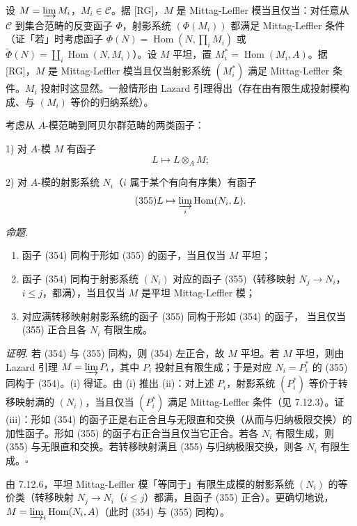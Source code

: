  设 $M=\varinjlim M_i$，$M_i\in\mathcal{C}$。据 [RG]，$M$ 是 Mittag-Leffler 模当且仅当：对任意从 $\mathcal{C}$ 到集合范畴的反变函子 $\Phi$，射影系统 $(\Phi(M_i))$ 都满足 Mittag-Leffler 条件（证「若」时考虑函子 $\Phi(N)=\operatorname{Hom}(N,\prod_i M_i)$ 或 $\tilde\Phi(N)=\coprod_i\operatorname{Hom}(N,M_i)$）。设 $M$ 平坦，置 $M^{*}_i=\operatorname{Hom}(M_i,A)$。据 [RG]，$M$ 是 Mittag-Leffler 模当且仅当射影系统 $(M^{*}_i)$ 满足 Mittag-Leffler 条件。$M_i$ 投射时这显然。一般情形由 Lazard 引理得出（存在由有限生成投射模构成、与 $(M_i)$ 等价的归纳系统）。

 考虑从 $A$-模范畴到阿贝尔群范畴的两类函子：

1) 对 $A$-模 $M$ 有函子
\begin{equation}\tag{354}
L\mapsto L\otimes_A M;
\end{equation}

2) 对 $A$-模的射影系统 $N_i$（$i$ 属于某个有向有序集）有函子
\begin{equation}\tag{355}
L\mapsto\varinjlim_i\operatorname{Hom}(N_i,L).
\end{equation}

 \emph{命题.}
\begin{enumerate}[label=(\roman*),leftmargin=2.2em]
\item 函子 (354) 同构于形如 (355) 的函子，当且仅当 $M$ 平坦；
\item 函子 (354) 同构于射影系统 $(N_i)$ 对应的函子 (355)（转移映射 $N_j\to N_i$，$i\le j$，都满），当且仅当 $M$ 是平坦 Mittag-Leffler 模；
\item 对应满转移映射射影系统的函子 (355) 同构于形如 (354) 的函子，%
%
当且仅当 (355) 正合且各 $N_i$ 有限生成。
\end{enumerate}

\emph{证明.} 若 (354) 与 (355) 同构，则 (354) 左正合，故 $M$ 平坦。若 $M$ 平坦，则由 Lazard 引理 $M=\varinjlim P_i$，其中 $P_i$ 投射且有限生成；于是对应 $N_i=P^{*}_i$ 的 (355) 同构于 (354)。(i) 得证。由 (i) 推出 (ii)：对上述 $P_i$，射影系统 $(P^{*}_i)$ 等价于转移映射满的 $(N_i)$，当且仅当 $(P^{*}_i)$ 满足 Mittag-Leffler 条件（见 7.12.3）。证 (iii)：形如 (354) 的函子正是右正合且与无限直和交换（从而与归纳极限交换）的加性函子。形如 (355) 的函子右正合当且仅当它正合。若各 $N_i$ 有限生成，则 (355) 与无限直和交换。若转移映射满且 (355) 与归纳极限交换，则各 $N_i$ 有限生成。\hfill$\square$

 由 7.12.6，平坦 Mittag-Leffler 模「等同于」有限生成模的射影系统 $(N_i)$ 的等价类（转移映射 $N_j\to N_i$（$i\le j$）都满，且函子 (355) 正合）。更确切地说，$M=\varinjlim_i\operatorname{Hom}(N_i,A)$（此时 (354) 与 (355) 同构）。

